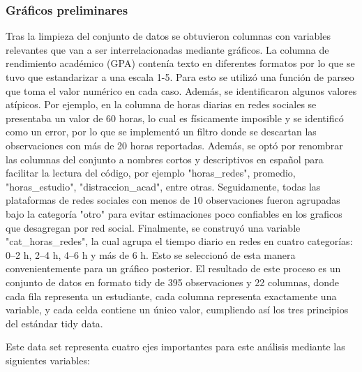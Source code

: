 \documentclass[12pt]{article}
\begin{document}
\subsubsection{Gráficos preliminares}

Tras la limpieza del conjunto de datos se obtuvieron columnas con variables relevantes que van a ser interrelacionadas mediante gráficos. La columna de rendimiento académico (GPA) contenía texto en diferentes formatos por lo que se tuvo que estandarizar a una escala 1-5. Para esto se utilizó una función de parseo que toma el valor numérico en cada caso. Además, se identificaron algunos valores atípicos. Por ejemplo, en la columna de horas diarias en redes sociales se presentaba un valor de 60 horas, lo cual es físicamente imposible y se identificó como un error, por lo que se implementó un filtro donde se descartan las observaciones con más de 20 horas reportadas. Además, se optó por renombrar las columnas del conjunto a nombres cortos y descriptivos en español para facilitar la lectura del código, por ejemplo "horas\_redes", promedio, "horas\_estudio", "distraccion\_acad", entre otras. Seguidamente, todas las plataformas de redes sociales con menos de 10 observaciones fueron agrupadas bajo la categoría "otro" para evitar estimaciones poco confiables en los graficos que desagregan por red social. Finalmente, se construyó una variable "cat\_horas\_redes", la cual agrupa el tiempo diario en redes en cuatro categorías: 0–2 h, 2–4 h, 4–6 h y más de 6 h. Esto se seleccionó de esta manera convenientemente para un gráfico posterior. El resultado de este proceso es un conjunto de datos en formato tidy de 395 observaciones y 22 columnas, donde cada fila representa un estudiante, cada columna representa exactamente una variable, y cada celda contiene un único valor, cumpliendo así los tres principios del estándar tidy data.

Este data set representa cuatro ejes importantes para este análisis mediante las siguientes variables:
\end{document}
